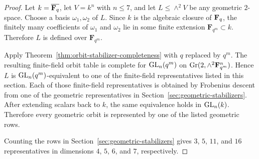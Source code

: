 \begin{proof}
Let \(k=\overline{\mathbf F_q}\), let \(V=k^n\) with \(n\le 7\), and let
\(L\le \wedge^2 V\) be any geometric \(2\)-space. Choose a basis
\(\omega_1,\omega_2\) of \(L\). Since \(k\) is the algebraic closure of \(\mathbf F_q\),
the finitely many coefficients of \(\omega_1\) and \(\omega_2\) lie in some
finite extension \(\mathbf F_{q^m}\subset k\). Therefore \(L\) is defined over
\(\mathbf F_{q^m}\).

Apply Theorem~\ref{thm:orbit-stabilizer-completeness} with \(q\) replaced by
\(q^m\). The resulting finite-field orbit table is complete for
\(\mathrm{GL}_n(q^m)\) on \(\mathrm{Gr}(2,\wedge^2 \mathbf F_{q^m}^n)\). Hence \(L\) is
\(\mathrm{GL}_n(q^m)\)-equivalent to one of the finite-field representatives listed in
this section. Each of those finite-field representatives is obtained by
Frobenius descent from one of the geometric representatives in
Section~\ref{sec:geometric-stabilizers}. After extending scalars back to \(k\),
the same equivalence holds in \(\mathrm{GL}_n(k)\). Therefore every geometric orbit is
represented by one of the listed geometric rows.

Counting the rows in Section~\ref{sec:geometric-stabilizers} gives \(3\), \(5\),
\(11\), and \(16\) representatives in dimensions \(4\), \(5\), \(6\), and
\(7\), respectively.
\end{proof}

